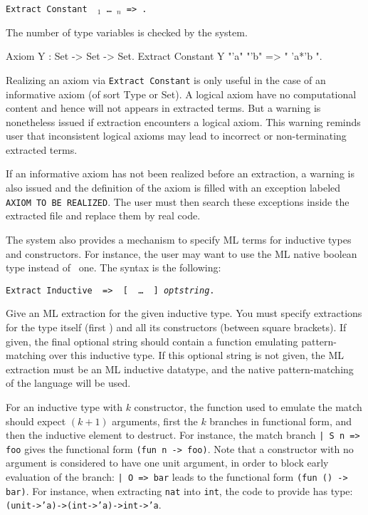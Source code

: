 \begin{description}
\item{\tt Extract Constant \qualid\ \str$_1$ \dots\ \str$_n$ => \str.}
\end{description}

The number of type variables is checked by the system. 

\Example
\begin{coq_example*}
Axiom Y : Set -> Set -> Set.
Extract Constant Y "'a" "'b" => " 'a*'b ".
\end{coq_example*}

Realizing an axiom via {\tt Extract Constant} is only useful in the
case of an informative axiom (of sort Type or Set). A logical axiom
have no computational content and hence will not appears in extracted
terms. But a warning is nonetheless issued if extraction encounters a
logical axiom. This warning reminds user that inconsistent logical
axioms may lead to incorrect or non-terminating extracted terms.

If an informative axiom has not been realized before an extraction, a
warning is also issued and the definition of the axiom is filled with
an exception labeled {\tt AXIOM TO BE REALIZED}. The user must then
search these exceptions inside the extracted file and replace them by
real code.


The system also provides a mechanism to specify ML terms for inductive
types and constructors.  For instance, the user may want to use the ML
native boolean type instead of \Coq\ one.  The syntax is the following:

\begin{description}
\item{\tt Extract Inductive \qualid\ => \str\ [ \str\ \dots\ \str\ ] {\it optstring}.}\par
  Give an ML extraction for the given inductive type. You must specify
  extractions for the type itself (first \str) and all its
  constructors (between square brackets). If given, the final optional
  string should contain a function emulating pattern-matching over this
  inductive type. If this optional string is not given, the ML
  extraction must be an ML inductive datatype, and the native
  pattern-matching of the language will be used.
\end{description}

For an inductive type with $k$ constructor, the function used to
emulate the match should expect $(k+1)$ arguments, first the $k$
branches in functional form, and then the inductive element to
destruct. For instance, the match branch \verb$| S n => foo$ gives the
functional form \verb$(fun n -> foo)$. Note that a constructor with no
argument is considered to have one unit argument, in order to block
early evaluation of the branch: \verb$| O => bar$ leads to the functional
form \verb$(fun () -> bar)$. For instance, when extracting {\tt nat}
into {\tt int}, the code to provide has type:
{\tt (unit->'a)->(int->'a)->int->'a}.
    
